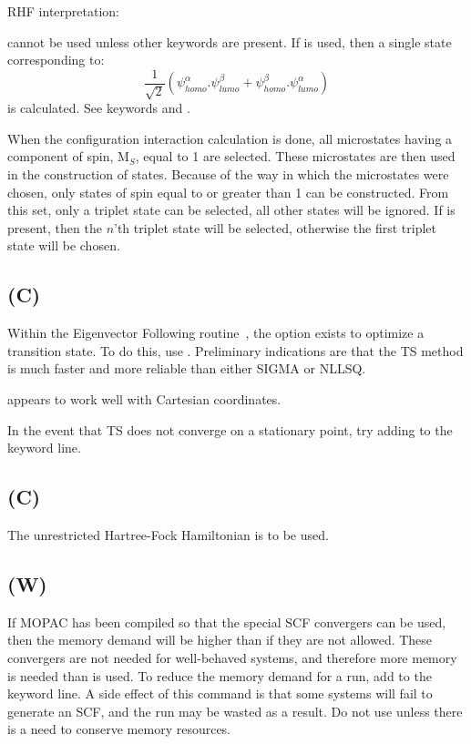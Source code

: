 RHF interpretation:

         cannot be used unless other keywords are present. If
 is used, then a single state corresponding to:
$$
\frac{1}{\sqrt{2}}(\psi_{homo}^{\alpha}.\psi_{lumo}^{\beta}+\psi_{homo}^{\beta}.\psi_{lumo}^{\alpha})
$$
is calculated.
   See keywords  and .

 When the configuration interaction calculation is done, all microstates having
a component of spin,  M$_S$, equal to   1 are selected.  These microstates are then
used in the construction of states.  Because of the way in which the microstates
were chosen, only states of spin equal to or greater than   1 can be constructed.
From this set, only a triplet state can be selected, all other states will be ignored.
If  is present, then the $n$'th triplet state will be selected,
otherwise the first triplet state will be  chosen.

\subsection*{ (C)}
        Within the Eigenvector  Following  routine~\cite{ef-ts},  the
   option  exists  to
   optimize   a   transition  state.   To  do  this,  use  .   Preliminary
   indications are that the TS method is much faster and more reliable  than
   either SIGMA or NLLSQ.

         appears to work well with Cartesian coordinates.

        In the event that TS does not converge on a  stationary  point,  try
   adding  to the keyword line.



\subsection*{ (C)}
        The unrestricted Hartree-Fock Hamiltonian is to be used.

\subsection*{ (W)}
\label{unsafe}
If MOPAC has been compiled so that the special SCF convergers can be used,
then the memory demand will be higher than if they are not allowed.
These convergers are not needed for well-behaved systems, and therefore
more memory is needed than is used.
To reduce the memory demand for a run, add  to the keyword line.
A side effect of this command is that some systems will fail to generate an SCF,
and the run may be wasted as a result. Do not use  unless there
is a need to conserve memory resources.

